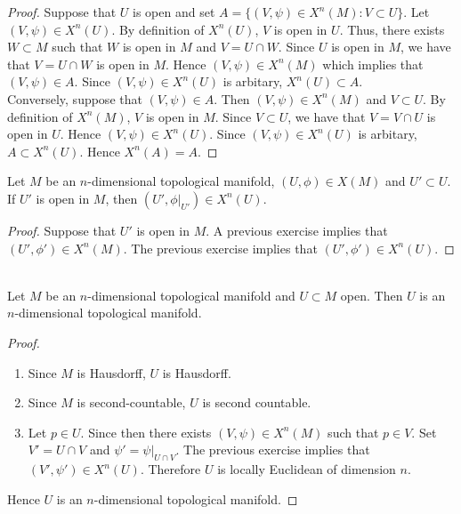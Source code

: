 \documentclass{book}
\begin{document}
	\begin{proof}
		Suppose that $U$ is open and set $A = \{(V, \psi) \in X^n(M): V \subset U\}$. Let $(V, \psi) \in X^n(U)$. By definition of $X^n(U)$, $V$ is open in $U$. Thus, there exists $W \subset M$ such that $W$ is open in $M$ and $V = U \cap W$. Since $U$ is open in $M$, we have that $V = U \cap W$ is open in $M$. Hence $(V, \psi) \in X^n(M)$ which implies that $(V, \psi) \in A$. Since $(V, \psi) \in X^n(U)$ is arbitary, $X^n(U) \subset A$. \\
		Conversely, suppose that $(V, \psi) \in A$. Then $(V, \psi) \in X^n(M)$ and $V \subset U$. By definition of $X^n(M)$, $V$ is open in $M$. Since $V \subset U$, we have that $V = V \cap U$ is open in $U$. Hence $(V, \psi) \in X^n(U)$. Since $(V, \psi) \in X^n(U)$ is arbitary, $A \subset X^n(U)$. Hence $X^n(A) = A$.
	\end{proof}
	
	\begin{ex} 
		Let $M$ be an $n$-dimensional topological manifold, $(U, \phi) \in X(M)$ and $U' \subset U$. If $U'$ is open in $M$, then $(U', \phi|_{U'}) \in X^n(U)$. 
	\end{ex}
	
	\begin{proof}
		Suppose that $U'$ is open in $M$. A previous exercise implies that $(U', \phi') \in X^n(M)$. The previous exercise implies that $(U', \phi') \in X^n(U)$.
	\end{proof}
	
	\begin{ex}  \\
		Let $M$ be an $n$-dimensional topological manifold and $U \subset M$ open. Then $U$ is an $n$-dimensional topological manifold. 
	\end{ex}
	
	\begin{proof} \
		\begin{enumerate}
			\item Since $M$ is Hausdorff, $U$ is Hausdorff.
			\item Since $M$ is second-countable, $U$ is second countable. 
			\item Let $p \in U$. Since then there exists $(V, \psi) \in X^n(M)$ such that $p \in V$. Set $V' = U \cap V$ and $\psi' = \psi|_{U \cap V}$. The previous exercise implies that $(V', \psi') \in X^n(U)$. Therefore $U$ is locally Euclidean of dimension $n$.
		\end{enumerate}
		Hence $U$ is an $n$-dimensional topological manifold.
	\end{proof}
\end{document}
